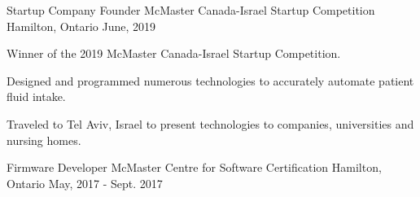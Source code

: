 
\begin{cventries}

  \cventry
    {Startup Company Founder} %
    {McMaster Canada-Israel Startup Competition} %
    {Hamilton, Ontario} %
    {June, 2019} %
    {
      \begin{cvitems} %
        \item {Winner of the 2019 McMaster Canada-Israel Startup Competition.}
        \item {Designed and programmed numerous technologies to accurately automate patient fluid intake.}
        \item {Traveled to Tel Aviv, Israel to present technologies to companies, universities and nursing homes.}
      \end{cvitems}
    }

  \cventry
    {Firmware Developer} %
    {McMaster Centre for Software Certification} %
    {Hamilton, Ontario} %
    {May, 2017 - Sept. 2017} %
    {
      \begin{cvitems} %
        \item {}
      \end{cvitems}
    }


\end{cventries}
